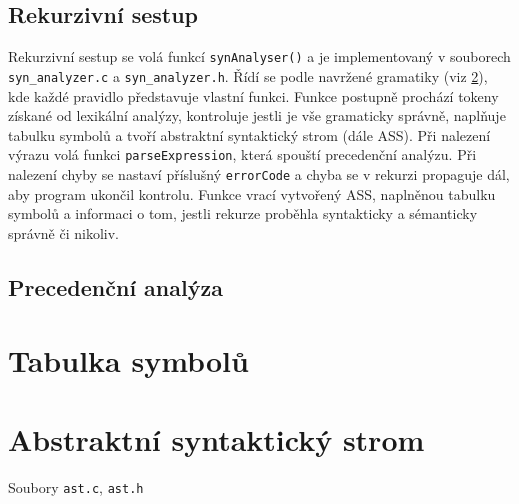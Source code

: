 \documentclass[a4paper, 12pt]{article}
\begin{document}
    \subsection{Rekurzivní sestup} \label{sestup}
        Rekurzivní sestup se volá funkcí \texttt{synAnalyser()} a je implementovaný v souborech \texttt{syn\_analyzer.c} a \texttt{syn\_analyzer.h}. Řídí se podle navržené gramatiky (viz \ref{}), kde každé pravidlo představuje vlastní funkci. Funkce postupně prochází tokeny získané od lexikální analýzy, kontroluje jestli je vše gramaticky správně, naplňuje tabulku symbolů a tvoří abstraktní syntaktický strom (dále ASS). Při nalezení výrazu volá funkci \texttt{parseExpression}, která spouští precedenční analýzu. Při nalezení chyby se nastaví příslušný \texttt{errorCode} a chyba se v rekurzi propaguje dál, aby program ukončil kontrolu. Funkce vrací vytvořený ASS, naplněnou tabulku symbolů a informaci o tom, jestli rekurze proběhla syntakticky a sémanticky správně či nikoliv.

    \subsection{Precedenční analýza}

    \section{Tabulka symbolů}

    \section{Abstraktní syntaktický strom}
    Soubory \texttt{ast.c}, \texttt{ast.h}
\end{document}
